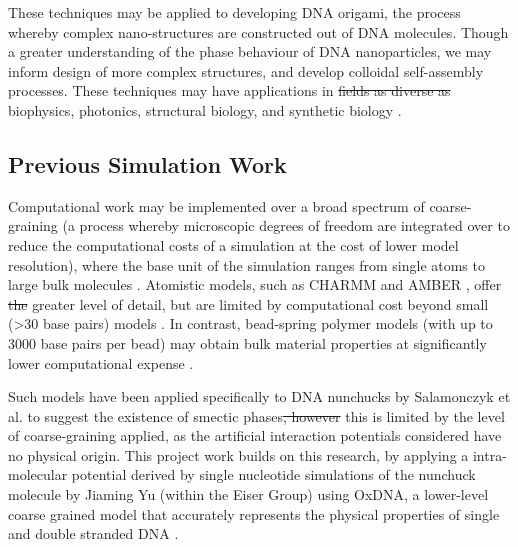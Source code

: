 \documentclass[11pt, a4paper]{article} %
\providecommand{\DIFadd}[1]{{\protect\color{blue}\uwave{#1}}} %
\providecommand{\DIFdel}[1]{{\protect\color{red}\sout{#1}}}                      %
\providecommand{\DIFaddbegin}{} %
\providecommand{\DIFaddend}{} %
\providecommand{\DIFdelbegin}{} %
\providecommand{\DIFdelend}{} %
\begin{document}
These techniques may be applied to developing DNA origami, the process whereby complex nano-structures are constructed out of DNA molecules. Though a greater understanding of the phase behaviour of DNA nanoparticles, we may inform design of more complex structures, and develop colloidal self-assembly processes. These techniques may have applications in \DIFdelbegin \DIFdel{fields as diverse as }\DIFdelend biophysics, photonics, structural biology, and synthetic biology \cite{Nummelin2018, Praetorius2017, Bathe2017}.


\subsection{Previous Simulation Work} \label{sec:PrevWork}
Computational work may be implemented over a broad spectrum of coarse-graining (a process whereby microscopic degrees of freedom are integrated over to reduce the computational costs of a simulation at the cost of lower model resolution), where the base unit of the simulation ranges from single atoms to large bulk molecules \cite{Inglfsson2013, Potoyan2012}. Atomistic models, such as CHARMM \cite{MacKerell1995} and AMBER \cite{SalomonFerrer2012}, offer \DIFdelbegin \DIFdel{the }\DIFdelend \DIFaddbegin \DIFadd{a }\DIFaddend greater level of detail, but are limited by computational cost beyond small (>30 base pairs) models \cite{Cheatham2004}. In contrast, bead-spring polymer models (with up to 3000 base pairs per bead) may obtain bulk material properties at significantly lower computational expense \cite{Michieletto2016}.

Such models have been applied specifically to DNA nunchucks by Salamonczyk et al. \cite{Salamonczyk2016} to suggest the existence of smectic phases\DIFdelbegin \DIFdel{, however }\DIFdelend \DIFaddbegin \DIFadd{. However, }\DIFaddend this is limited by the level of coarse-graining applied, as the artificial interaction potentials considered have no physical origin. This project work builds on this research, by applying a intra-molecular potential derived by single nucleotide simulations of the nunchuck molecule by Jiaming Yu (within the Eiser Group) using OxDNA, a lower-level coarse grained model that accurately represents the physical properties of single and double stranded DNA \cite{OxDNA}.
\end{document}
